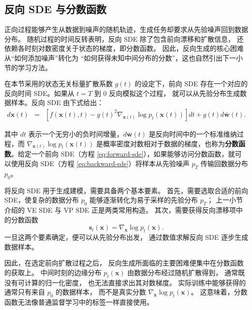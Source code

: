 \documentclass[UTF8,a4paper,zihao=-4,oneside,openany]{ctexbook}
\begin{document}
\subsection{反向 SDE 与分数函数}

正向过程能够产生从数据到噪声的随机轨迹，生成任务却要求从先验噪声回到数据分布。
随机过程的时间反转表明，反向 SDE 除了包含前向漂移和扩散信息，
还依赖各时刻对数密度关于状态的梯度，即分数函数。
因此，反向生成的核心困难从“如何添加噪声”转化为
“如何获得未知中间分布的分数”，这也自然引出下一小节的学习方法。

在本节采用的状态无关标量扩散系数 $g(t)$ 的设定下，前向 SDE
存在一个对应的反向时间 SDE。如果从 $t=T$ 到 $0$ 反向模拟这个过程，
就可以从先验分布生成数据样本。反向 SDE 由下式给出：
\begin{eqnarray}
d\mathbf{x}(t) & = & \left[ f(\mathbf{x}(t), t) - g(t)^2 \nabla_{\mathbf{x}(t)} \log p_t(\mathbf{x}(t)) \right] dt + g(t) d\bar{\mathbf{w}}(t).
\label{eq:backward-sde}
\end{eqnarray}

\noindent 其中 $dt$ 表示一个无穷小的负时间增量，$d\bar{\mathbf{w}}(t)$ 是反向时间中的一个标准维纳过程，而 $\nabla_{\mathbf{x}(t)} \log p_t(\mathbf{x}(t))$ 是概率密度对数相对于数据的梯度，也称为\textbf{分数函数}。给定一个前向 SDE（方程 \eqref{eq:forward-sde}），如果能够访问分数函数，就可以使用反向 SDE（方程 \eqref{eq:backward-sde}）将样本从先验噪声 $p_T$ 传输回数据分布 $p_0$。




将反向 SDE 用于生成建模，需要具备两个基本要素。
首先，需要选取合适的前向 SDE，使复杂的数据分布
\(p_0\) 能够逐渐转化为易于采样的先验分布 \(p_T\)；
上一小节介绍的 VE SDE 与 VP SDE 正是两类常用构造。
其次，需要获得反向漂移项中的分数函数
\begin{equation}
    \mathbf{s}_t(\mathbf{x})
    =
    \nabla_{\mathbf{x}}\log p_t(\mathbf{x}).
    \label{eq:reverse-sde-score-function}
\end{equation}
一旦这两个要素确定，便可以从先验分布出发，
通过数值求解反向 SDE 逐步生成数据样本。

因此，在选定前向扩散过程之后，
反向生成所面临的主要困难便集中在分数函数的获取上。
中间时刻的边缘分布
\(p_t(\mathbf{x})\)
由数据分布经过随机扩散得到，
通常既没有可计算的归一化密度，
也无法直接求出其对数梯度。
实际训练中能够获得的通常只有来自
\(p_0\) 的数据样本，
而不是真实分数
\(\nabla_{\mathbf{x}}\log p_t(\mathbf{x})\)。
这意味着，分数函数无法像普通监督学习中的标签一样直接使用。
\end{document}
